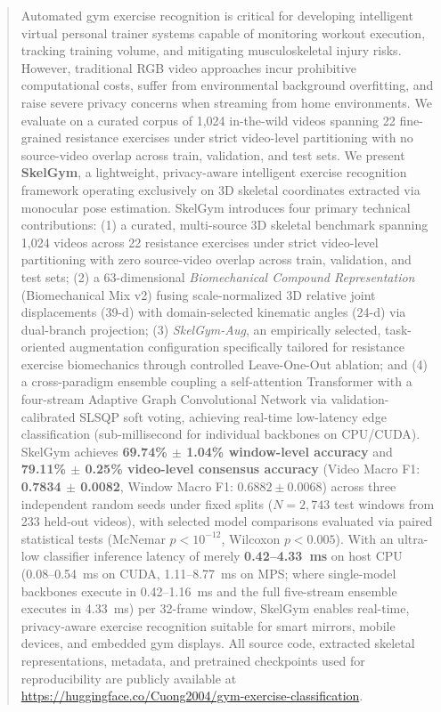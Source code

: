 \documentclass[runningheads]{llncs}
\begin{document}
\begin{abstract}
Automated gym exercise recognition is critical for developing intelligent virtual personal trainer systems capable of monitoring workout execution, tracking training volume, and mitigating musculoskeletal injury risks. However, traditional RGB video approaches incur prohibitive computational costs, suffer from environmental background overfitting, and raise severe privacy concerns when streaming from home environments. We evaluate on a curated corpus of 1,024 in-the-wild videos spanning 22 fine-grained resistance exercises under strict video-level partitioning with no source-video overlap across train, validation, and test sets. We present \textbf{SkelGym}, a lightweight, privacy-aware intelligent exercise recognition framework operating exclusively on 3D skeletal coordinates extracted via monocular pose estimation. SkelGym introduces four primary technical contributions: (1) a curated, multi-source 3D skeletal benchmark spanning 1,024 videos across 22 resistance exercises under strict video-level partitioning with zero source-video overlap across train, validation, and test sets; (2) a 63-dimensional \textit{Biomechanical Compound Representation} (Biomechanical Mix v2) fusing scale-normalized 3D relative joint displacements (39-d) with domain-selected kinematic angles (24-d) via dual-branch projection; (3) \textit{SkelGym-Aug}, an empirically selected, task-oriented augmentation configuration specifically tailored for resistance exercise biomechanics through controlled Leave-One-Out ablation; and (4) a cross-paradigm ensemble coupling a self-attention Transformer with a four-stream Adaptive Graph Convolutional Network via validation-calibrated SLSQP soft voting, achieving real-time low-latency edge classification (sub-millisecond for individual backbones on CPU/CUDA). SkelGym achieves \textbf{69.74\% $\pm$ 1.04\% window-level accuracy} and \textbf{79.11\% $\pm$ 0.25\% video-level consensus accuracy} (Video Macro F1: \textbf{0.7834 $\pm$ 0.0082}, Window Macro F1: $0.6882 \pm 0.0068$) across three independent random seeds under fixed splits ($N=2,743$ test windows from 233 held-out videos), with selected model comparisons evaluated via paired statistical tests (McNemar $p < 10^{-12}$, Wilcoxon $p < 0.005$). With an ultra-low classifier inference latency of merely \textbf{0.42--4.33~ms} on host CPU (0.08--0.54~ms on CUDA, 1.11--8.77~ms on MPS; where single-model backbones execute in 0.42--1.16~ms and the full five-stream ensemble executes in 4.33~ms) per 32-frame window, SkelGym enables real-time, privacy-aware exercise recognition suitable for smart mirrors, mobile devices, and embedded gym displays. All source code, extracted skeletal representations, metadata, and pretrained checkpoints used for reproducibility are publicly available at \url{https://huggingface.co/Cuong2004/gym-exercise-classification}.

\end{abstract}
\end{document}
